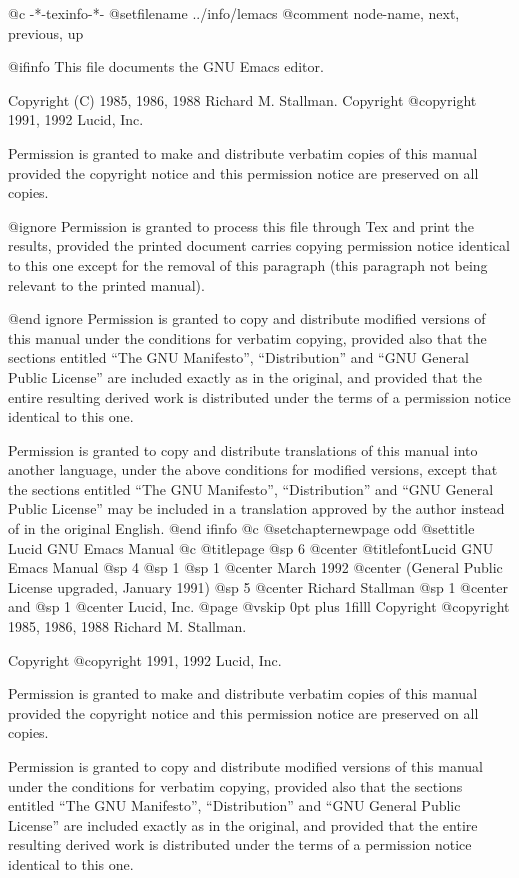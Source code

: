   @c -*-texinfo-*-
@setfilename ../info/lemacs
@comment  node-name,  next,  previous,  up


@ifinfo
This file documents the GNU Emacs editor.

Copyright (C) 1985, 1986, 1988 Richard M. Stallman.
Copyright @copyright{} 1991, 1992 Lucid, Inc.

Permission is granted to make and distribute verbatim copies of
this manual provided the copyright notice and this permission notice
are preserved on all copies.

@ignore
Permission is granted to process this file through Tex and print the
results, provided the printed document carries copying permission
notice identical to this one except for the removal of this paragraph
(this paragraph not being relevant to the printed manual).

@end ignore
Permission is granted to copy and distribute modified versions of this
manual under the conditions for verbatim copying, provided also that the
sections entitled ``The GNU Manifesto'', ``Distribution'' and ``GNU
General Public License'' are included exactly as in the original, and
provided that the entire resulting derived work is distributed under the
terms of a permission notice identical to this one.

Permission is granted to copy and distribute translations of this manual
into another language, under the above conditions for modified versions,
except that the sections entitled ``The GNU Manifesto'',
``Distribution'' and ``GNU General Public License'' may be included in a
translation approved by the author instead of in the original English.
@end ifinfo
@c
@setchapternewpage odd
@settitle Lucid GNU Emacs Manual
@c
@titlepage
@sp 6
@center @titlefont{Lucid GNU Emacs Manual}
@sp 4
@sp 1
@sp 1
@center March 1992
@center (General Public License upgraded, January 1991)
@sp 5
@center Richard Stallman
@sp 1
@center and
@sp 1
@center Lucid, Inc.
@page
@vskip 0pt plus 1filll
Copyright @copyright{} 1985, 1986, 1988 Richard M. Stallman.

Copyright @copyright{} 1991, 1992 Lucid, Inc.

Permission is granted to make and distribute verbatim copies of
this manual provided the copyright notice and this permission notice
are preserved on all copies.

Permission is granted to copy and distribute modified versions of this
manual under the conditions for verbatim copying, provided also that the
sections entitled ``The GNU Manifesto'', ``Distribution'' and ``GNU
General Public License'' are included exactly as in the original, and
provided that the entire resulting derived work is distributed under the
terms of a permission notice identical to this one.

